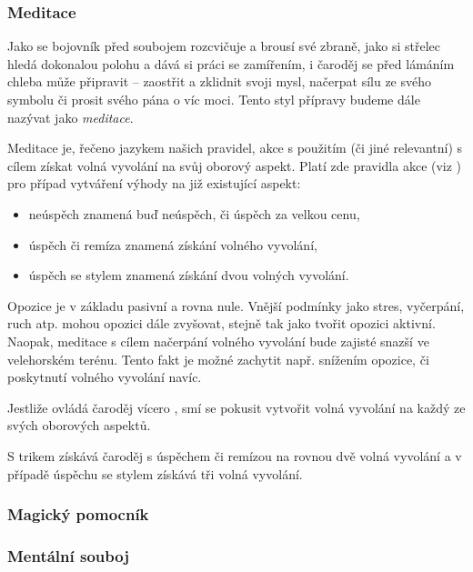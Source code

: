 \documentclass[../main.tex]{subfiles}
\begin{document}
\subsubsection*{Meditace}
\label{sec:meditace}

Jako se bojovník před soubojem rozcvičuje a brousí své zbraně, jako si střelec hledá dokonalou polohu a dává si práci se zamířením, i čaroděj se před lámáním chleba může připravit – zaostřit a zklidnit svoji mysl, načerpat sílu ze svého symbolu či prosit svého pána o víc moci. Tento styl přípravy budeme dále nazývat jako \emph{meditace}.

Meditace je, řečeno jazykem našich pravidel, akce  s použitím  (či jiné relevantní) s cílem získat volná vyvolání na svůj oborový aspekt. Platí zde pravidla akce  (viz ) pro případ vytváření výhody na již existující aspekt:

\begin{itemize}
	\item neúspěch znamená buď neúspěch, či úspěch za velkou cenu,
	\item úspěch či remíza znamená získání volného vyvolání,
	\item úspěch se stylem znamená získání dvou volných vyvolání.
\end{itemize}

Opozice je v základu pasivní a rovna nule. Vnější podmínky jako stres, vyčerpání, ruch atp. mohou opozici dále zvyšovat, stejně tak jako tvořit opozici aktivní. Naopak, meditace s cílem načerpání volného vyvolání  bude zajisté snazší ve velehorském terénu. Tento fakt je možné zachytit např. snížením opozice, či poskytnutí volného vyvolání navíc.

Jestliže ovládá čaroděj vícero , smí se pokusit vytvořit volná vyvolání na každý ze svých oborových aspektů.

S trikem  získává čaroděj s úspěchem či remízou na  rovnou dvě volná vyvolání a v případě úspěchu se stylem získává tři volná vyvolání.

\subsubsection*{Magický pomocník}
\label{sec:magickypomocnik}

\subsubsection*{Mentální souboj}
\label{sec:mentalnisouboj}
\end{document}
